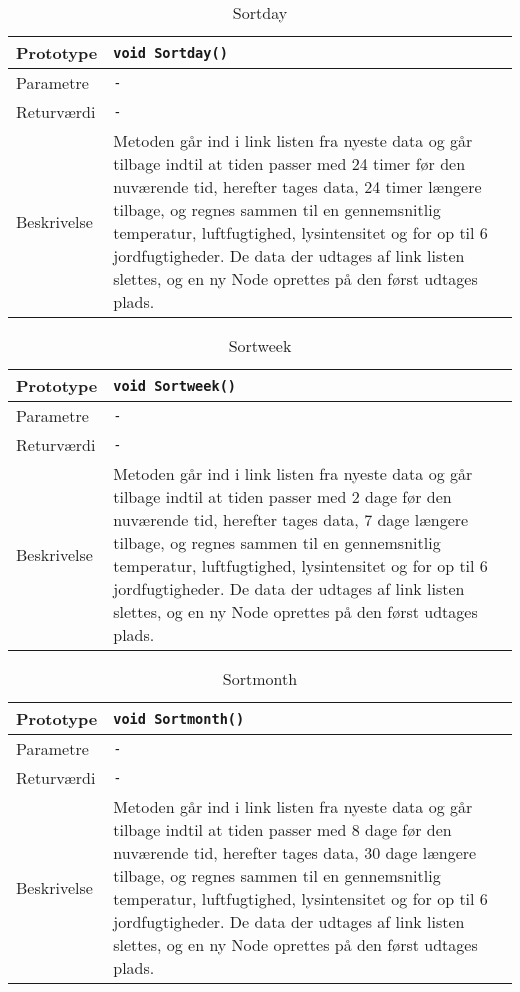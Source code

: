 \begin{table}[h]
\begin{tabularx}{\textwidth}{| >{\raggedright\arraybackslash}p{2.5 cm} | >{\raggedright\arraybackslash}X |} \hline
Prototype & \texttt{void Sortday()} \\\hline
Parametre & \texttt{-}\\\hline
Returværdi & \texttt{-} \\\hline
Beskrivelse & Metoden går ind i link listen fra nyeste data og går tilbage indtil at tiden passer med 24 timer før den nuværende tid, herefter tages data, 24 timer længere tilbage, og regnes sammen til en gennemsnitlig temperatur, luftfugtighed, lysintensitet og for op til 6 jordfugtigheder. De data der udtages af link listen slettes, og en ny Node oprettes på den først udtages plads. \\\hline
\end{tabularx}
\caption{Sortday}
\label{table:Sortday}
\end{table}


\begin{table}[h]
\begin{tabularx}{\textwidth}{| >{\raggedright\arraybackslash}p{2.5 cm} | >{\raggedright\arraybackslash}X |} \hline
Prototype & \texttt{void Sortweek()} \\\hline
Parametre & \texttt{-}\\\hline
Returværdi & \texttt{-} \\\hline
Beskrivelse & Metoden går ind i link listen fra nyeste data og går tilbage indtil at tiden passer med 2 dage før den nuværende tid, herefter tages data, 7 dage længere tilbage, og regnes sammen til en gennemsnitlig temperatur, luftfugtighed, lysintensitet og for op til 6 jordfugtigheder. De data der udtages af link listen slettes, og en ny Node oprettes på den først udtages plads. \\\hline
\end{tabularx}
\caption{Sortweek}
\label{table:Sortweek}
\end{table}


\begin{table}[h]
\begin{tabularx}{\textwidth}{| >{\raggedright\arraybackslash}p{2.5 cm} | >{\raggedright\arraybackslash}X |} \hline
Prototype & \texttt{void Sortmonth()} \\\hline
Parametre & \texttt{-}\\\hline
Returværdi & \texttt{-} \\\hline
Beskrivelse & Metoden går ind i link listen fra nyeste data og går tilbage indtil at tiden passer med 8 dage før den nuværende tid, herefter tages data, 30 dage længere tilbage, og regnes sammen til en gennemsnitlig temperatur, luftfugtighed, lysintensitet og for op til 6 jordfugtigheder. De data der udtages af link listen slettes, og en ny Node oprettes på den først udtages plads. \\\hline
\end{tabularx}
\caption{Sortmonth}
\label{table:Sortmonth}
\end{table}